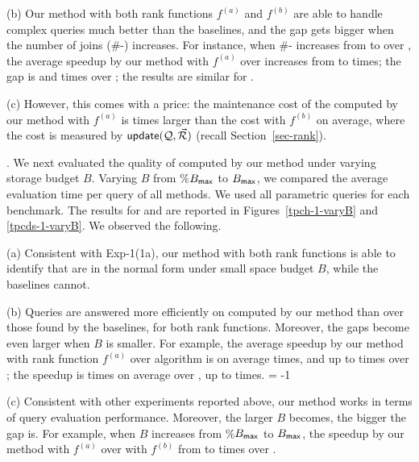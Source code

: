 \sstab (b) Our method with both rank functions $f^{(a)}$ and
$f^{(b)}$ are able to handle complex queries much better than
the baselines, and the gap gets bigger when the number
of joins (\#-) increases.
For instance, when \#- increases from  to  over
\tpcds, the average speedup by our method with $f^{(a)}$ over
\qcssel increases from  to  times; the gap is  and 
times over \uscsel; the results are similar for \tpch.


\sstab (c) However, this comes with a price: the maintenance cost
of the \bdss computed by our method with $f^{(a)}$ is  times
larger than the cost with $f^{(b)}$ on average,
where the cost is measured by ${\mathsf{update}}(\mathcal Q, \vec{{\mathcal R}})$ (recall Section~\ref{sec-rank}). 


. We next evaluated the
quality of \bdss computed by our method under varying storage
budget $B$. Varying $B$ from \%$B_{\protect\mathsf{max}}$ to
$B_{\protect\mathsf{max}}$, we compared the average evaluation time per query
of all methods. We used all parametric queries for each
benchmark.
The results for \tpch and \tpcds are reported in
Figures~\ref{tpch-1-varyB} and \ref{tpcds-1-varyB}.
We observed the following.

\sstab (a) Consistent with Exp-1(1a), our method with both
rank functions is able to identify \bdss that
are in the normal form under small space budget $B$,
while the baselines cannot.

\sstab (b) Queries are answered more efficiently on \bdss
computed by our method than over those found by the baselines,
for both rank functions.
Moreover, the gaps become even larger when $B$ is
smaller. For example, the average speedup by our method with
rank function $f^{(a)}$ over algorithm \qcssel is on average 
times, and up to  times over \tpch; the speedup is %
 times
on average over \tpcds, up to  times.
\looseness = -1

\sstab (c) Consistent with other experiments reported
above, our method works 
in terms of query evaluation performance.
Moreover, the larger $B$ becomes, the bigger the gap is. 
For example, when $B$ increases from \%$B_{\protect\mathsf{max}}$ to
$B_{\protect\mathsf{max}}$, the speedup by
our method with $f^{(a)}$ over with $f^{(b)}$  from 
to  times over \tpch. 



